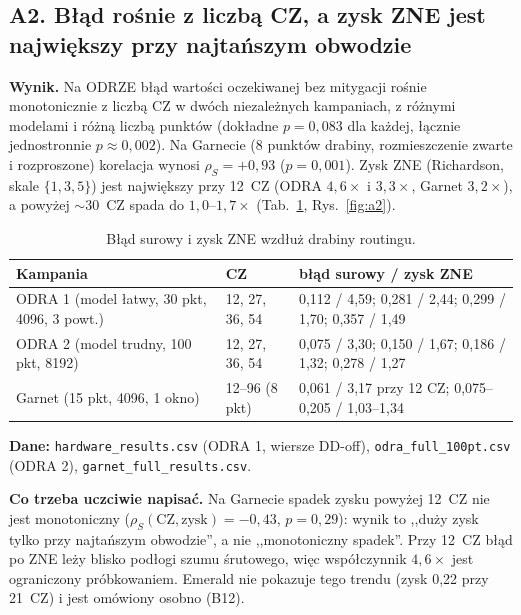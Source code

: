 \documentclass[11pt,a4paper]{article}
\begin{document}
\subsection*{A2. Błąd rośnie z liczbą CZ, a zysk ZNE jest największy przy najtańszym obwodzie}

\textbf{Wynik.} Na ODRZE błąd wartości oczekiwanej bez mitygacji rośnie monotonicznie z
liczbą CZ w dwóch niezależnych kampaniach, z różnymi modelami i różną liczbą punktów
(dokładne $p=0{,}083$ dla każdej, łącznie jednostronnie $p\approx0{,}002$). Na Garnecie
(8 punktów drabiny, rozmieszczenie zwarte i rozproszone) korelacja wynosi
$\rho_S=+0{,}93$ ($p=0{,}001$). Zysk ZNE (Richardson, skale $\{1,3,5\}$) jest największy przy
12~CZ (ODRA $4{,}6\times$ i $3{,}3\times$, Garnet $3{,}2\times$), a powyżej $\sim$30~CZ spada
do $1{,}0$--$1{,}7\times$ (Tab.~\ref{tab:a2}, Rys.~\ref{fig:a2}).

\begin{table}[h]\centering\small
\caption{Błąd surowy i zysk ZNE wzdłuż drabiny routingu.}
\label{tab:a2}
\begin{tabular}{@{}p{4.3cm}p{1.9cm}p{8.6cm}@{}}
\toprule
Kampania & CZ & błąd surowy / zysk ZNE \\
\midrule
ODRA 1 (model łatwy, 30 pkt, 4096, 3 powt.) & 12, 27, 36, 54 & 0{,}112 / 4{,}59; 0{,}281 / 2{,}44; 0{,}299 / 1{,}70; 0{,}357 / 1{,}49 \\
ODRA 2 (model trudny, 100 pkt, 8192) & 12, 27, 36, 54 & 0{,}075 / 3{,}30; 0{,}150 / 1{,}67; 0{,}186 / 1{,}32; 0{,}278 / 1{,}27 \\
Garnet (15 pkt, 4096, 1 okno) & 12--96 (8 pkt) & 0{,}061 / 3{,}17 przy 12 CZ; 0{,}075--0{,}205 / 1{,}03--1{,}34 \\
\bottomrule
\end{tabular}
\end{table}

\textbf{Dane:} \texttt{hardware\_results.csv} (ODRA 1, wiersze DD-off),
\texttt{odra\_full\_100pt.csv} (ODRA 2), \texttt{garnet\_full\_results.csv}.

\textbf{Co trzeba uczciwie napisać.} Na Garnecie spadek zysku powyżej 12~CZ nie jest
monotoniczny ($\rho_S(\text{CZ},\text{zysk})=-0{,}43$, $p=0{,}29$): wynik to ,,duży zysk
tylko przy najtańszym obwodzie'', a nie ,,monotoniczny spadek''. Przy 12~CZ błąd po ZNE leży
blisko podłogi szumu śrutowego, więc współczynnik $4{,}6\times$ jest ograniczony próbkowaniem.
Emerald nie pokazuje tego trendu (zysk 0{,}22 przy 21~CZ) i jest omówiony osobno (B12).
\end{document}
